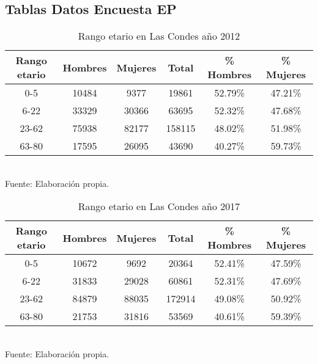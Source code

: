 \documentclass[12pt]{article} %
\begin{document}
\subsection{Tablas Datos Encuesta EP} \label{sec:Datos_EP}

\begin{table}[H]
    \centering
    \caption{Rango etario en Las Condes año 2012}
    \vspace{0.2cm}
    \begin{tabular}{|c|c|c|c|c|c|}
        \hline
        \textbf{Rango etario} & \textbf{Hombres} & \textbf{Mujeres} & \textbf{Total} & \textbf{\% Hombres} & \textbf{\% Mujeres} \\ \hline
        0-5 & 10484 & 9377 & 19861 & 52.79\% & 47.21\% \\ \hline
        6-22 & 33329 & 30366 & 63695 & 52.32\% & 47.68\% \\ \hline
        23-62 & 75938 & 82177 & 158115 & 48.02\% & 51.98\% \\ \hline
        63-80 & 17595 & 26095 & 43690 & 40.27\% & 59.73\% \\ \hline
    \end{tabular}
    \label{Cuadro 4}
    \vspace{0.2cm}
    \\Fuente: Elaboración propia.
\end{table}

\begin{table}[H]
    \centering
    \caption{Rango etario en Las Condes año 2017}
    \vspace{0.2cm}
    \begin{tabular}{|c|c|c|c|c|c|}
        \hline
        \textbf{Rango etario} & \textbf{Hombres} & \textbf{Mujeres} & \textbf{Total} & \textbf{\% Hombres} & \textbf{\% Mujeres} \\ \hline
        0-5 & 10672 & 9692 & 20364 & 52.41\% & 47.59\% \\ \hline
        6-22 & 31833 & 29028 & 60861 & 52.31\% & 47.69\% \\ \hline
        23-62 & 84879 & 88035 & 172914 & 49.08\% & 50.92\% \\ \hline
        63-80 & 21753 & 31816 & 53569 & 40.61\% & 59.39\% \\ \hline
    \end{tabular}
    \label{Cuadro 5}
    \vspace{0.2cm}
    \\Fuente: Elaboración propia.
\end{table}
\end{document}
